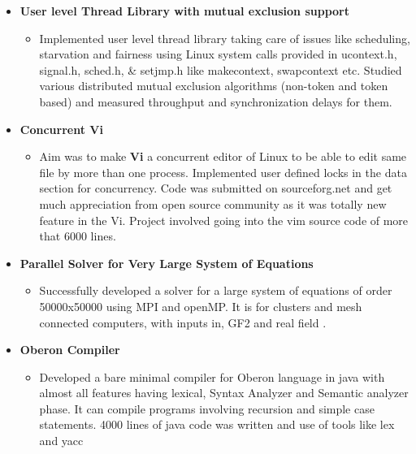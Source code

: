 \documentclass[]{res}
\makeatletter
\newcommand{\resitem}[1]{\item #1 \vspace{-2pt}}
\newcommand{\resheading}[1]{{\large \parashade[.9]{sharpcorners}{\textbf{#1 \vphantom{p\^{E}}}}}}
\newcommand{\ressubheading}[4]{
\begin{tabular*}{6.5in}{l@{\extracolsep{\fill}}r}
		\textbf{#1} & #2 \\
		\textit{#3} & \textit{#4} \\
\end{tabular*}\vspace{-6pt}}
\makeatother
\begin{document}
\resheading{Major Projects  }
\vspace{-0.2in}
\begin{itemize}
	
\vspace{-0.1in}
			\item \textbf{User level Thread Library with mutual exclusion support }	
		\vspace{-0.1in}	
		\begin{itemize}
		\resitem{
		Implemented user level thread library taking care of issues like scheduling, starvation and fairness using  Linux system calls provided in ucontext.h, signal.h, sched.h, \& setjmp.h like makecontext, swapcontext etc. Studied various distributed mutual exclusion algorithms (non-token and token based) and measured throughput and synchronization delays for  them.
		 }
		\end{itemize}	
		\vspace{-0.1in}
			\item \textbf{Concurrent Vi }	
		\vspace{-0.1in}	
		\begin{itemize}
		\resitem{Aim was to make \textbf{Vi} a concurrent editor of Linux to be  able to edit same file by more than one process. Implemented user defined locks in the data section for concurrency. Code was submitted on sourceforg.net and get much appreciation from open source community as it was totally new feature in the Vi. Project involved going into the vim source code of more that 6000 lines. }
		\end{itemize}	
\vspace{-0.1in}		
			\item \textbf{Parallel Solver for Very Large System of Equations }
		\vspace{-0.1in}
		\begin{itemize}
		\resitem{ Successfully developed a solver for a large system of equations of order 50000x50000 using MPI and openMP. It is for clusters and mesh connected computers, with inputs in, GF2  and  real field . }
		
		\end{itemize}			
	\vspace{-0.1in}
	\item \textbf{Oberon Compiler }
		\vspace{-0.1in}
		\begin{itemize}
		\resitem{ Developed a bare minimal compiler for Oberon language in java with almost all  features having  lexical, Syntax Analyzer and Semantic analyzer phase. It can compile programs involving recursion and simple case statements. 4000 lines of  java code was written and use of tools like lex and yacc}
		\end{itemize}		
		

\end{itemize}
\end{document}
